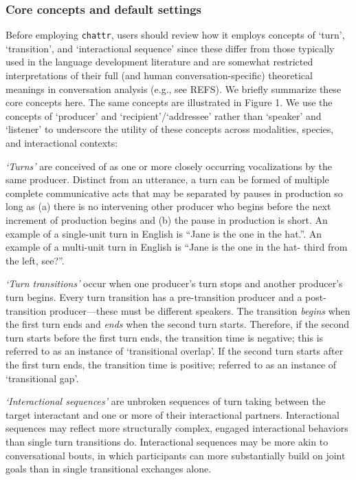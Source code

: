 \documentclass[10pt, letterpaper]{article}
\begin{document}
\hypertarget{core-concepts-and-default-settings}{%
\subsubsection{Core concepts and default
settings}\label{core-concepts-and-default-settings}}

Before employing \texttt{chattr}, users should review how it employs
concepts of `turn', `transition', and `interactional sequence' since
these differ from those typically used in the language development
literature and are somewhat restricted interpretations of their full
(and human conversation-specific) theoretical meanings in conversation
analysis (e.g., see REFS). We briefly summarize these core concepts
here. The same concepts are illustrated in Figure 1. We use the concepts
of `producer' and `recipient'/`addressee' rather than `speaker' and
`listener' to underscore the utility of these concepts across
modalities, species, and interactional contexts:

\emph{`Turns'} are conceived of as one or more closely occurring
vocalizations by the same producer. Distinct from an utterance, a turn
can be formed of multiple complete communicative acts that may be
separated by pauses in production so long as (a) there is no intervening
other producer who begins before the next increment of production begins
and (b) the pause in production is short. An example of a single-unit
turn in English is ``Jane is the one in the hat.''. An example of a
multi-unit turn in English is ``Jane is the one in the hat- third from
the left, see?''.

\emph{`Turn transitions'} occur when one producer's turn stops and
another producer's turn begins. Every turn transition has a
pre-transition producer and a post-transition producer---these must be
different speakers. The transition \emph{begins} when the first turn
ends and \emph{ends} when the second turn starts. Therefore, if the
second turn starts before the first turn ends, the transition time is
negative; this is referred to as an instance of `transitional overlap'.
If the second turn starts after the first turn ends, the transition time
is positive; referred to as an instance of `transitional gap'.

\emph{`Interactional sequences'} are unbroken sequences of turn taking
between the target interactant and one or more of their interactional
partners. Interactional sequences may reflect more structurally complex,
engaged interactional behaviors than single turn transitions do.
Interactional sequences may be more akin to conversational bouts, in
which participants can more substantially build on joint goals than in
single transitional exchanges alone.
\end{document}
